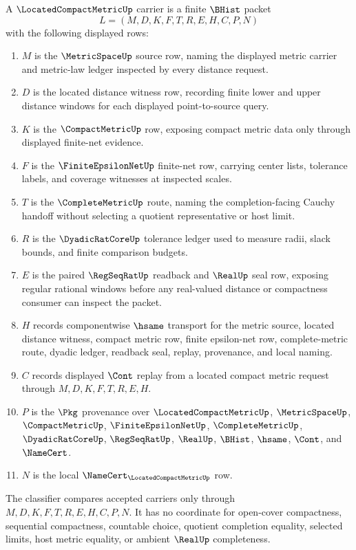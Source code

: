 \begin{definition}
\label{def:located-compact-metric-carrier}
A $\LocatedCompactMetricUp$ carrier is a finite $\BHist$ packet
$$
L=(M,D,K,F,T,R,E,H,C,P,N)
$$
with the following displayed rows:
\begin{enumerate}
\item $M$ is the $\MetricSpaceUp$ source row, naming the displayed metric carrier and metric-law ledger inspected by every distance request.
\item $D$ is the located distance witness row, recording finite lower and upper distance windows for each displayed point-to-source query.
\item $K$ is the $\CompactMetricUp$ row, exposing compact metric data only through displayed finite-net evidence.
\item $F$ is the $\FiniteEpsilonNetUp$ finite-net row, carrying center lists, tolerance labels, and coverage witnesses at inspected scales.
\item $T$ is the $\CompleteMetricUp$ route, naming the completion-facing Cauchy handoff without selecting a quotient representative or host limit.
\item $R$ is the $\DyadicRatCoreUp$ tolerance ledger used to measure radii, slack bounds, and finite comparison budgets.
\item $E$ is the paired $\RegSeqRatUp$ readback and $\RealUp$ seal row, exposing regular rational windows before any real-valued distance or compactness consumer can inspect the packet.
\item $H$ records componentwise $\hsame$ transport for the metric source, located distance witness, compact metric row, finite epsilon-net row, complete-metric route, dyadic ledger, readback seal, replay, provenance, and local naming.
\item $C$ records displayed $\Cont$ replay from a located compact metric request through $M,D,K,F,T,R,E,H$.
\item $P$ is the $\Pkg$ provenance over $\LocatedCompactMetricUp$, $\MetricSpaceUp$, $\CompactMetricUp$, $\FiniteEpsilonNetUp$, $\CompleteMetricUp$, $\DyadicRatCoreUp$, $\RegSeqRatUp$, $\RealUp$, $\BHist$, $\hsame$, $\Cont$, and $\NameCert$.
\item $N$ is the local $\NameCert_{\LocatedCompactMetricUp}$ row.
\end{enumerate}
The classifier compares accepted carriers only through $M,D,K,F,T,R,E,H,C,P,N$. It has no coordinate for open-cover compactness, sequential compactness, countable choice, quotient completion equality, selected limits, host metric equality, or ambient $\RealUp$ completeness.
\end{definition}

